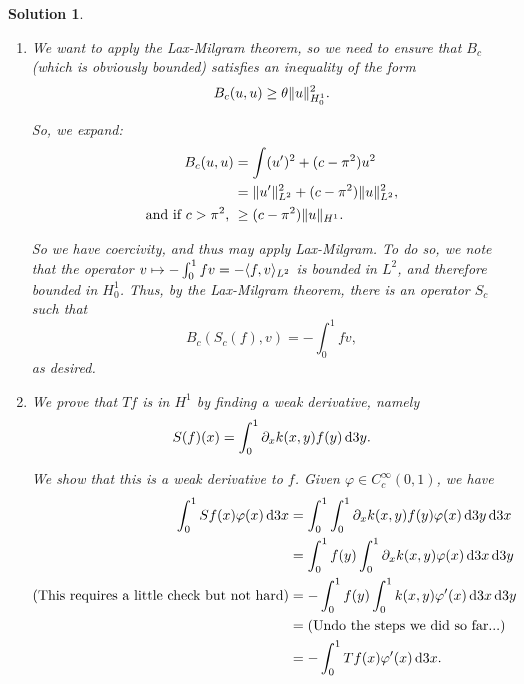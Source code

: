 \documentclass{article}
\theoremstyle{nonumberplain}
\newtheorem{sol}{Solution}
\DeclarePairedDelimiter{\Norm}{\lVert}{\rVert}
\DeclarePairedDelimiter{\braket}{\langle}{\rangle}
\begin{document}
\begin{sol}
\leavevmode
\begin{enumerate}
\item We want to apply the Lax-Milgram theorem, so we need to ensure that $B_c$ (which is obviously bounded) satisfies an inequality of the form
\begin{equation}
B_c(u,u) \geq \theta \Norm{u}^2_{H^1_0}.
\end{equation}

So, we expand:
\begin{equation}
\begin{aligned}
B_c(u,u)
&= \int (u')^2 + (c-\pi^2) u^2\\
&= \Norm{u'}^2_{L^2} + (c-\pi^2) \Norm{u}^2_{L^2},\\
\text{and if $c > \pi^2$, } &\geq (c-\pi^2) \Norm{u}_{H^1}.
\end{aligned}
\end{equation}

So we have coercivity, and thus may apply Lax-Milgram. To do so, we note that the operator $v \mapsto -\int_0^1 f v = - \braket{f,v}_{L^2}$ is bounded in $L^2$, and therefore bounded in $H^1_0$. Thus, by the Lax-Milgram theorem, there is an operator $S_c$ such that
\begin{equation}
B_c(S_c(f),v) = - \int_0^1 f v,
\end{equation}
as desired.

\item We prove that $Tf$ is in $H^1$ by finding a weak derivative, namely
\begin{equation}
S(f)(x) = \int_0^1 \partial_x k(x,y) f(y) \dl3 y.
\end{equation}

We show that this is a weak derivative to $f$. Given $\varphi \in C^\infty_c(0,1)$, we have
\begin{equation}
\begin{aligned}
\int_0^1 Sf(x) \varphi(x) \dl3 x
&= \int_0^1 \int_0^1 \partial_x k(x,y) f(y) \varphi(x) \dl3 y \dl3 x\\
&= \int_0^1 f(y) \int_0^1 \partial_x k(x,y) \varphi(x) \dl3 x \dl3 y\\
\text{(This requires a little check but not hard)} &= - \int_0^1 f(y) \int_0^1 k(x,y) \varphi'(x) \dl3 x \dl3 y\\
&= \text{(Undo the steps we did so far...)}\\
&= - \int_0^1 Tf(x) \varphi'(x) \dl3 x.
\end{aligned}
\end{equation}


\end{enumerate}
\end{sol}
\end{document}
